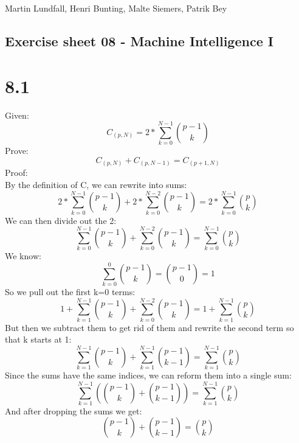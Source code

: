 \documentclass[11pt,a4paper]{article}
\begin{document}
\noindent
Martin Lundfall, Henri Bunting, Malte Siemers, Patrik Bey
\begin{centering}
  \section*{Exercise sheet 08 - Machine Intelligence I}
  \end{centering}
\section*{8.1}
Given:
\begin{equation}
C_{(p, N)} = 2*\sum_{k = 0}^{N - 1}{p-1 \choose k}
\end{equation}
Prove:
\begin{equation}
C_{(p, N)} + C_{(p, N-1)} = C_{(p+1, N)}
\end{equation}
Proof:\\
By the definition of C, we can rewrite into sums:
\begin{equation}
2*\sum_{k = 0}^{N - 1}{p-1 \choose k} + 2*\sum_{k = 0}^{N - 2}{p-1 \choose k} = 2*\sum_{k = 0}^{N - 1}{p \choose k}
\end{equation}
We can then divide out the 2:
\begin{equation}
\sum_{k = 0}^{N - 1}{p-1 \choose k} + \sum_{k = 0}^{N - 2}{p-1 \choose k} = \sum_{k = 0}^{N - 1}{p \choose k}
\end{equation}
We know:
\begin{equation}
\sum_{k = 0}^{0}{p-1 \choose k} = {p-1 \choose 0} = 1
\end{equation}
So we pull out the first k=0 terms:
\begin{equation}
1+\sum_{k = 1}^{N - 1}{p-1 \choose k} + \sum_{k = 0}^{N - 2}{p-1 \choose k} = 1+\sum_{k = 1}^{N - 1}{p \choose k}
\end{equation}
But then we subtract them to get rid of them and rewrite the second term so that k starts at 1:
\begin{equation}
\sum_{k = 1}^{N - 1}{p-1 \choose k} + \sum_{k = 1}^{N - 1}{p-1 \choose k-1} = \sum_{k = 1}^{N - 1}{p \choose k}
\end{equation}
Since the sums have the same indices, we can reform them into a single sum:
\begin{equation}
\sum_{k = 1}^{N - 1}({p-1 \choose k} + {p-1 \choose k-1}) = \sum_{k = 1}^{N - 1}{p \choose k}
\end{equation}
And after dropping the sums we get:
\begin{equation}
{p-1 \choose k} + {p-1 \choose k-1} = {p \choose k}
\end{equation}
\end{document}
